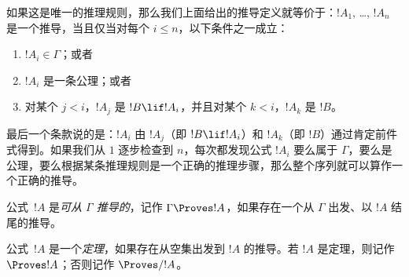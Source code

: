 \documentclass[../../../include/open-logic-section]{subfiles}
\begin{document}
如果这是唯一的推理规则，那么我们上面给出的推导定义就等价于：$!A_1$, \dots, $!A_n$ 是一个推导，当且仅当对每个 $i \le n$，以下条件之一成立：

\begin{enumerate}
\item $!A_i \in \Gamma$；或者
\item $!A_i$ 是一条公理；或者
\item 对某个 $j < i$，$!A_j$ 是 $!B \lif !A_i$，并且对某个 $k < i$，$!A_k$ 是 $!B$。
\end{enumerate}

最后一个条款说的是：$!A_i$ 由 $!A_j$（即 $!B \lif !A_i$）和 $!A_k$（即 $!B$）通过肯定前件式得到。如果我们从 $1$ 逐步检查到 $n$，每次都发现公式 $!A_i$ 要么属于 $\Gamma$，要么是公理，要么根据某条推理规则是一个正确的推理步骤，那么整个序列就可以算作一个正确的推导。

\begin{defn}[可推导性]
公式~$!A$ 是\emph{可从 $\Gamma$ 推导的}，记作 $\Gamma \Proves !A$，如果存在一个从 $\Gamma$ 出发、以 $!A$ 结尾的推导。
\end{defn}

\begin{defn}[定理]
公式~$!A$ 是一个\emph{定理}，如果存在从空集出发到 $!A$ 的推导。若 $!A$ 是定理，则记作 $\Proves !A$；否则记作 $\Proves/ !A$。
\end{defn}
\end{document}

